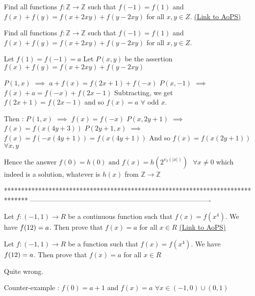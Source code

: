 \begin{problem}
	Find all functions $f: \mathbb{Z}\to\mathbb{Z}$ such that $f(-1)=f(1)$ and $f(x)+f(y)=f(x+2xy)+f(y-2xy)$ for all $x,y{\in}Z$.
	\flushright \href{https://artofproblemsolving.com/community/c6h575002}{(Link to AoPS)}
\end{problem}



\begin{solution}
	\begin{tcolorbox}Find all functions $f: \mathbb{Z}\to\mathbb{Z}$ such that $f(-1)=f(1)$ and $f(x)+f(y)=f(x+2xy)+f(y-2xy)$ for all $x,y{\in}Z$.\end{tcolorbox}
Let $f(1)=f(-1)=a$
Let $P(x,y)$ be the assertion $f(x)+f(y)=f(x+2xy)+f(y-2xy)$

$P(1,x)$ $\implies$ $a+f(x)=f(2x+1)+f(-x)$
$P(x,-1)$ $\implies$ $f(x)+a=f(-x)+f(2x-1)$
Subtracting, we get $f(2x+1)=f(2x-1)$ and so $f(x)=a$ $\forall$ odd $x$.

Then :
$P(1,x)$ $\implies$ $f(x)=f(-x)$
$P(x,2y+1)$ $\implies$ $f(x)=f(x(4y+3))$
$P(2y+1,x)$ $\implies$ $f(x)=f(-x(4y+1))=f(x(4y+1))$
And so $f(x)=f(x(2y+1))$ $\forall x,y$

Hence the answer $\boxed{f(0)=h(0)\text{ and }f(x)=h(2^{v_2(|x|)})\text{  }\forall x\ne 0}$ which indeed is a solution, whatever is $h(x)$ from $\mathbb Z\to\mathbb Z$
\end{solution}
*******************************************************************************
-------------------------------------------------------------------------------

\begin{problem}
	Let $f:(-1,1)\rightarrow R$ be a continuous function such that $f(x)=f(x^4)$. We have $f(1\/2)=a$. Then prove that $f(x)=a$ for all $x\in R$
	\flushright \href{https://artofproblemsolving.com/community/c6h575168}{(Link to AoPS)}
\end{problem}



\begin{solution}
	\begin{tcolorbox}Let $f:(-1,1)\rightarrow R$ be a function such that $f(x)=f(x^4)$. We have $f(1\/2)=a$. Then prove that $f(x)=a$ for all $x\in R$\end{tcolorbox}
Quite wrong.

Counter-example : $f(0)=a+1$ and $f(x)=a$ $\forall x\in(-1,0)\cup(0,1)$
\end{solution}



